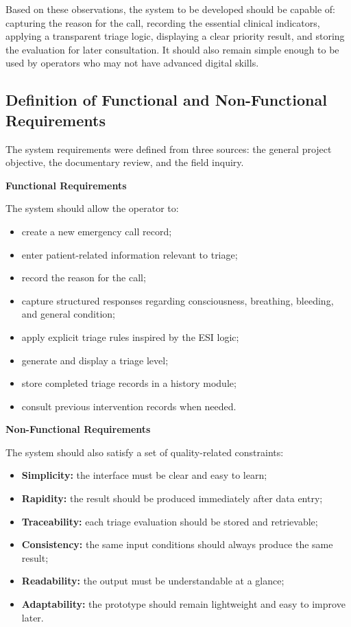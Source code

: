 \documentclass[a4paper,12pt,oneside]{report}
\begin{document}
Based on these observations, the system to be developed should be capable of: capturing the reason for the call, recording the essential clinical indicators, applying a transparent triage logic, displaying a clear priority result, and storing the evaluation for later consultation. It should also remain simple enough to be used by operators who may not have advanced digital skills.

\subsection{Definition of Functional and Non-Functional Requirements}

The system requirements were defined from three sources: the general project objective, the documentary review, and the field inquiry.

\textbf{Functional Requirements}

The system should allow the operator to:
\begin{itemize}
    \item create a new emergency call record;
    \item enter patient-related information relevant to triage;
    \item record the reason for the call;
    \item capture structured responses regarding consciousness, breathing, bleeding, and general condition;
    \item apply explicit triage rules inspired by the ESI logic;
    \item generate and display a triage level;
    \item store completed triage records in a history module;
    \item consult previous intervention records when needed.
\end{itemize}

\textbf{Non-Functional Requirements}

The system should also satisfy a set of quality-related constraints:
\begin{itemize}
    \item \textbf{Simplicity:} the interface must be clear and easy to learn;
    \item \textbf{Rapidity:} the result should be produced immediately after data entry;
    \item \textbf{Traceability:} each triage evaluation should be stored and retrievable;
    \item \textbf{Consistency:} the same input conditions should always produce the same result;
    \item \textbf{Readability:} the output must be understandable at a glance;
    \item \textbf{Adaptability:} the prototype should remain lightweight and easy to improve later.
\end{itemize}
\end{document}
